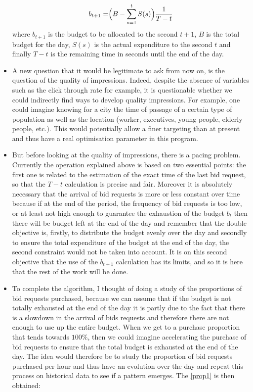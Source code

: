 \documentclass[12pt]{article}
\begin{document}
\begin{itemize}
$$b_{t+1} = \Bigr(B - \displaystyle \sum_{s=1}^{t} S(s)\Bigl) \dfrac{1}{T-t}$$
where $b_{t+1}$ is the budget to be allocated to the second $t+1$, $B$ is the total budget for the day, $S(s)$ is the actual expenditure to the second $t$ and finally $T-t$ is the remaining time in seconds until the end of the day.  
\item A new question that it would be legitimate to ask from now on, is the question of the quality of impressions. Indeed, despite the absence of variables such as the click through rate for example, it is questionable whether we could indirectly find ways to develop quality impressions. For example, one could imagine knowing for a city the time of passage of a certain type of population as well as the location (worker, executives, young people, elderly people, etc.). This would potentially allow a finer targeting than at present and thus have a real optimisation parameter in this program.
\item But before looking at the quality of impressions, there is a pacing problem. Currently the operation explained above is based on two essential points: the first one is related to the estimation of the exact time of the last bid request, so that the $T-t$ calculation is precise and fair. Moreover it is absolutely necessary that the arrival of bid requests is more or less constant over time because if at the end of the period, the frequency of bid requests is too low, or at least not high enough to guarantee the exhaustion of the budget $b_t$ then there will be budget left at the end of the day and remember that the double objective is, firstly, to distribute the budget evenly over the day and secondly to ensure the total expenditure of the budget at the end of the day, the second constraint would not be taken into account. It is on this second objective that the use of the $b_{t+1}$ calculation has its limits, and so it is here that the rest of the work will be done.
\item To complete the algorithm, I thought of doing a study of the proportions of bid requests purchased, because we can assume that if the budget is not totally exhausted at the end of the day it is partly due to the fact that there is a slowdown in the arrival of bids requests and therefore there are not enough to use up the entire budget. When we get to a purchase proportion that tends towards $100\%$, then we could imagine accelerating the purchase of bid requests to ensure that the total budget is exhausted at the end of the day. The idea would therefore be to study the proportion of bid requests purchased per hour and thus have an evolution over the day and repeat this process on historical data to see if a pattern emerges. The \autoref{prop1} is then obtained:


\end{itemize}
\end{document}
